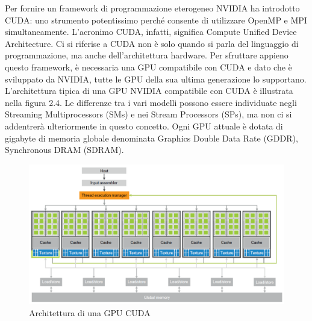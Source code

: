 Per fornire un framework di programmazione eterogeneo NVIDIA ha introdotto CUDA: uno strumento potentissimo perché consente di utilizzare OpenMP e MPI simultaneamente. L'acronimo CUDA, infatti, significa Compute Unified Device Architecture. Ci si riferise a CUDA non è solo quando si parla del linguaggio di programmazione, ma anche dell'architettura hardware. Per sfruttare appieno questo framework, è necessaria una GPU compatibile con CUDA e dato che è sviluppato da NVIDIA, tutte le GPU della sua ultima generazione lo supportano. L'architettura tipica di una GPU NVIDIA compatibile con CUDA è illustrata nella figura 2.4. Le differenze tra i vari modelli possono essere individuate negli Streaming Multiprocessors (SMs) e nei Stream Processors (SPs), ma non ci si addentrerà ulteriormente in questo concetto. Ogni GPU attuale è dotata di gigabyte di memoria globale denominata Graphics Double Data Rate (GDDR), Synchronous DRAM (SDRAM).

\begin{figure}[ht]
    \centering
    \includegraphics[width=.9\linewidth]{images/chapter2/cuda_arch.png}
    \caption{Architettura di una GPU CUDA}
    \label{fig:cuda_arch}
\end{figure}











